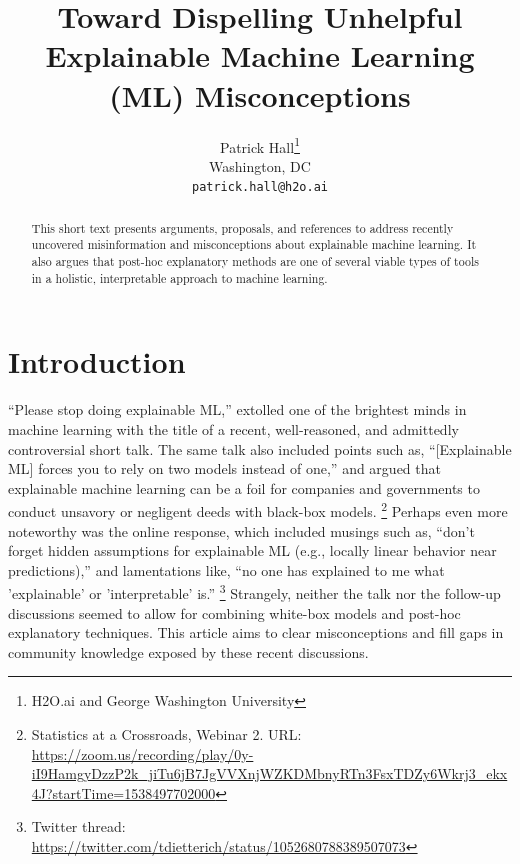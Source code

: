 \documentclass{article}
\title{Toward Dispelling Unhelpful Explainable Machine Learning (ML) Misconceptions}
\author{
  Patrick Hall\thanks{H2O.ai and George Washington University}\\
  Washington, DC\\
  \texttt{patrick.hall@h2o.ai}}
\begin{document}
\maketitle

\begin{abstract}

This short text presents arguments, proposals, and references to address recently uncovered misinformation and misconceptions about explainable machine learning. It also argues that post-hoc explanatory methods are one of several viable types of tools in a holistic, interpretable approach to machine learning.

\end{abstract}

\section{Introduction}

``Please stop doing explainable ML,'' extolled one of the brightest minds in machine learning with the title of a recent, well-reasoned, and admittedly controversial short talk. The same talk also included points such as, ``[Explainable ML] forces you to rely on two models instead of one,'' and argued that explainable machine learning can be a foil for companies and governments to conduct unsavory or negligent deeds with black-box models. \footnote{Statistics at a Crossroads, Webinar 2. URL: \url{https://zoom.us/recording/play/0y-iI9HamgyDzzP2k_jiTu6jB7JgVVXnjWZKDMbnyRTn3FsxTDZy6Wkrj3_ekx4J?startTime=1538497702000}} Perhaps even more noteworthy was the online response, which included musings such as, ``don’t forget hidden assumptions for explainable ML (e.g., locally linear behavior near predictions),'' and lamentations like, ``no one has explained to me what 'explainable' or 'interpretable' is.'' \footnote{Twitter thread: \url{https://twitter.com/tdietterich/status/1052680788389507073}} Strangely, neither the talk nor the follow-up discussions seemed to allow for combining white-box models and post-hoc explanatory techniques. This article aims to clear misconceptions and fill gaps in community knowledge exposed by these recent discussions. 
\end{document}
